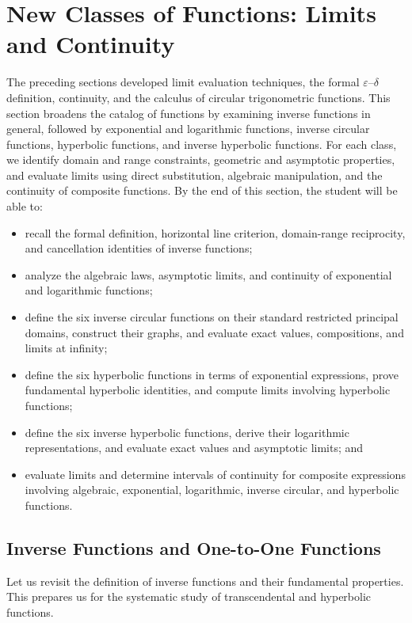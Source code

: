 \section{New Classes of Functions: Limits and Continuity}
\label{sec:1.7}

The preceding sections developed limit evaluation techniques, the formal \(\varepsilon\)--\(\delta\) definition, continuity, and the calculus of circular trigonometric functions. This section broadens the catalog of functions by examining inverse functions in general, followed by exponential and logarithmic functions, inverse circular functions, hyperbolic functions, and inverse hyperbolic functions. For each class, we identify domain and range constraints, geometric and asymptotic properties, and evaluate limits using direct substitution, algebraic manipulation, and the continuity of composite functions. By the end of this section, the student will be able to:
\begin{itemize}
    \item recall the formal definition, horizontal line criterion, domain-range reciprocity, and cancellation identities of inverse functions;
    \item analyze the algebraic laws, asymptotic limits, and continuity of exponential and logarithmic functions;
    \item define the six inverse circular functions on their standard restricted principal domains, construct their graphs, and evaluate exact values, compositions, and limits at infinity;
    \item define the six hyperbolic functions in terms of exponential expressions, prove fundamental hyperbolic identities, and compute limits involving hyperbolic functions;
    \item define the six inverse hyperbolic functions, derive their logarithmic representations, and evaluate exact values and asymptotic limits; and
    \item evaluate limits and determine intervals of continuity for composite expressions involving algebraic, exponential, logarithmic, inverse circular, and hyperbolic functions.
\end{itemize}

\subsection*{Inverse Functions and One-to-One Functions}
\label{subsec:1.7.1}

Let us revisit the definition of inverse functions and their fundamental properties. This prepares us for the systematic study of transcendental and hyperbolic functions.

